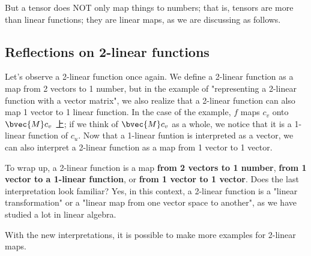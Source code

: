But a tensor does NOT only map things to numbers; that is, tensors are more than linear functions; they are linear maps, as we are discussing as follows. 

\subsection{Reflections on 2-linear functions}
Let's observe a 2-linear function once again. We define a 2-linear function as a map from 2 vectors to 1 number, but in the example of "representing a 2-linear function with a vector matrix", we also realize that a 2-linear function can also map 1 vector to 1 linear function. In the case of the example, $f$ maps $c_v$ onto $\bvec{M}c_v$ 上; if we think of $\bvec{M}c_v$ as a whole, we notice that it is a 1-linear function of $c_u$. Now that a 1-linear funtion is interpreted as a vector, we can also interpret a 2-linear function as a map from 1 vector to 1 vector. 

To wrap up, a 2-linear function is a map \textbf{from 2 vectors to 1 number}, \textbf{from 1 vector to a 1-linear function}, or \textbf{from 1 vector to 1 vector}. Does the last interpretation look familiar? Yes, in this context, a 2-linear function is a "linear transformation" or a "linear map from one vector space to another", as we have studied a lot in linear algebra. 

With the new interpretations, it is possible to make more examples for 2-linear maps. 

